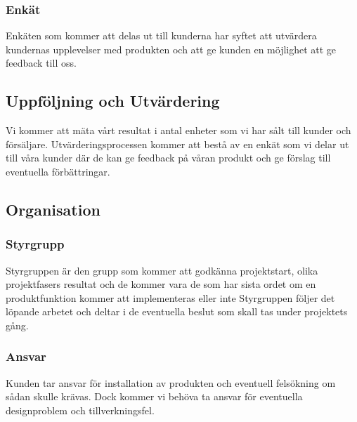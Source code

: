 \documentclass{article}
\begin{document}
	\subsubsection{Enkät}
	Enkäten som kommer att delas ut till kunderna har syftet att utvärdera kundernas upplevelser med produkten och att ge kunden en möjlighet att ge feedback till oss.
	\subsection{Uppföljning och Utvärdering}
	Vi kommer att mäta vårt resultat i antal enheter som vi har sålt till kunder och försäljare. \newline Utvärderingsprocessen kommer att bestå av en enkät som vi delar ut till våra kunder där de kan ge feedback på våran produkt och ge förslag till eventuella förbättringar.

	\subsection{Organisation}
	\subsubsection{Styrgrupp}
	Styrgruppen är den grupp som kommer att godkänna projektstart, olika projektfasers resultat och de kommer vara de som har sista ordet om en produktfunktion kommer att implementeras eller inte Styrgruppen följer det löpande arbetet och deltar i de eventuella beslut som skall tas under projektets gång.
	
	\subsubsection{Ansvar}
	Kunden tar ansvar för installation av produkten och eventuell felsökning om sådan skulle krävas. Dock kommer vi behöva ta ansvar för eventuella designproblem och tillverkningsfel.
\end{document}
